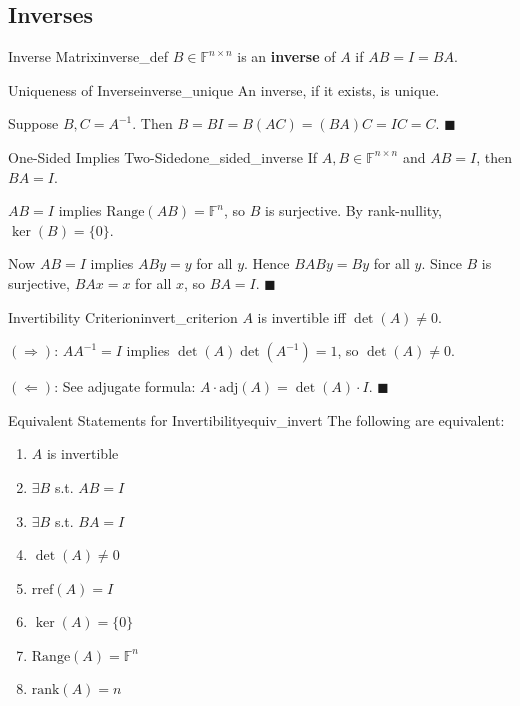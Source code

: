 \documentclass[11pt, letterpaper, openany]{book}
\renewenvironment{proof}[1][\proofname]{%
  \tcolorbox[blanker, breakable, left=1em,
    before skip=1em, after skip=1em,
    borderline west={2pt}{0pt}{MagicTeal!50},
    colback=MagicCream,
    before upper={\textcolor{MagicTeal}{\sffamily\bfseries #1.}\space}
  ]%
}{%
  \hfill\textcolor{MagicTeal}{\ensuremath{\blacksquare}}\endtcolorbox%
}
\begin{document}
\subsection{Inverses}

\begin{defn}{Inverse Matrix}{inverse_def}
$B \in \mathbb{F}^{n \times n}$ is an \textbf{inverse} of $A$ if $AB = I = BA$.
\end{defn}

\begin{lem}{Uniqueness of Inverse}{inverse_unique}
An inverse, if it exists, is unique.
\end{lem}

\begin{proof}
Suppose $B, C = A^{-1}$. Then $B = BI = B(AC) = (BA)C = IC = C$.
\end{proof}

\begin{lem}{One-Sided Implies Two-Sided}{one_sided_inverse}
If $A, B \in \mathbb{F}^{n \times n}$ and $AB = I$, then $BA = I$.
\end{lem}

\begin{proof}
$AB = I$ implies $\text{Range}(AB) = \mathbb{F}^n$, so $B$ is surjective. By rank-nullity, $\ker(B) = \{0\}$.

Now $AB = I$ implies $ABy = y$ for all $y$. Hence $BABy = By$ for all $y$. Since $B$ is surjective, $BAx = x$ for all $x$, so $BA = I$.
\end{proof}

\begin{thm}{Invertibility Criterion}{invert_criterion}
$A$ is invertible iff $\det(A) \neq 0$.
\end{thm}

\begin{proof}
$(\Rightarrow)$: $AA^{-1} = I$ implies $\det(A)\det(A^{-1}) = 1$, so $\det(A) \neq 0$.

$(\Leftarrow)$: See adjugate formula: $A \cdot \text{adj}(A) = \det(A) \cdot I$.
\end{proof}

\begin{thm}{Equivalent Statements for Invertibility}{equiv_invert}
The following are equivalent:
\begin{enumerate}
    \item $A$ is invertible
    \item $\exists B$ s.t. $AB = I$
    \item $\exists B$ s.t. $BA = I$
    \item $\det(A) \neq 0$
    \item $\text{rref}(A) = I$
    \item $\ker(A) = \{0\}$
    \item $\text{Range}(A) = \mathbb{F}^n$
    \item $\text{rank}(A) = n$
\end{enumerate}
\end{thm}
\end{document}
